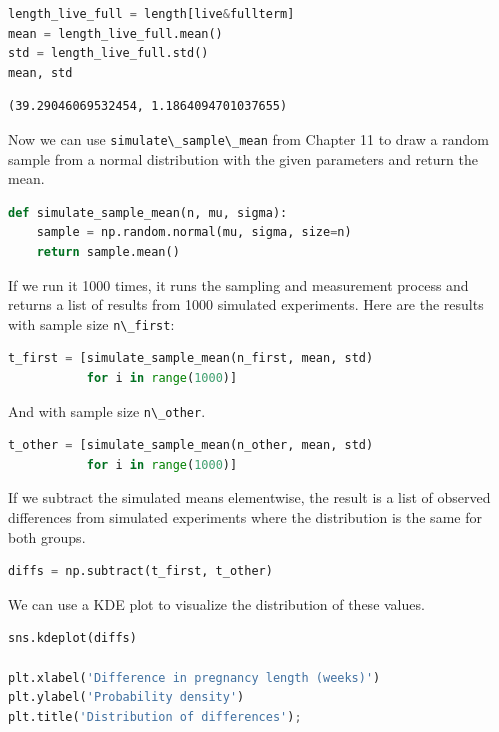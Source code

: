 \begin{lstlisting}[language=Python,style=source]
length_live_full = length[live&fullterm]
mean = length_live_full.mean()
std = length_live_full.std()
mean, std
\end{lstlisting}

\begin{lstlisting}[style=output]
(39.29046069532454, 1.1864094701037655)
\end{lstlisting}

Now we can use \passthrough{\lstinline!simulate\_sample\_mean!} from
Chapter 11 to draw a random sample from a normal distribution with the
given parameters and return the mean.

\begin{lstlisting}[language=Python,style=source]
def simulate_sample_mean(n, mu, sigma):
    sample = np.random.normal(mu, sigma, size=n)
    return sample.mean()
\end{lstlisting}

If we run it 1000 times, it runs the sampling and measurement process
and returns a list of results from 1000 simulated experiments. Here are
the results with sample size \passthrough{\lstinline!n\_first!}:

\begin{lstlisting}[language=Python,style=source]
t_first = [simulate_sample_mean(n_first, mean, std)
           for i in range(1000)]
\end{lstlisting}

And with sample size \passthrough{\lstinline!n\_other!}.

\begin{lstlisting}[language=Python,style=source]
t_other = [simulate_sample_mean(n_other, mean, std)
           for i in range(1000)]
\end{lstlisting}

If we subtract the simulated means elementwise, the result is a list of
observed differences from simulated experiments where the distribution
is the same for both groups.

\begin{lstlisting}[language=Python,style=source]
diffs = np.subtract(t_first, t_other)
\end{lstlisting}

We can use a KDE plot to visualize the distribution of these values.

\begin{lstlisting}[language=Python,style=source]
sns.kdeplot(diffs)

plt.xlabel('Difference in pregnancy length (weeks)')
plt.ylabel('Probability density')
plt.title('Distribution of differences');
\end{lstlisting}

